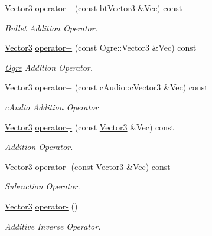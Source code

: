 \begin{DoxyCompactItemize}
\hyperlink{classMezzanine_1_1Vector3}{Vector3} \hyperlink{classMezzanine_1_1Vector3_ab9093d82a813c4c700daf6d01a66633b}{operator+} (const btVector3 \&Vec) const 
\begin{DoxyCompactList}\small\item\em Bullet Addition Operator. \item\end{DoxyCompactList}\item 
\hyperlink{classMezzanine_1_1Vector3}{Vector3} \hyperlink{classMezzanine_1_1Vector3_a1a11c416872d294739a505c04250d58d}{operator+} (const Ogre::Vector3 \&Vec) const 
\begin{DoxyCompactList}\small\item\em \hyperlink{namespaceOgre}{Ogre} Addition Operator. \item\end{DoxyCompactList}\item 
\hyperlink{classMezzanine_1_1Vector3}{Vector3} \hyperlink{classMezzanine_1_1Vector3_a1df3f5ceba13194dc744b551fb4ddbc2}{operator+} (const cAudio::cVector3 \&Vec) const 
\begin{DoxyCompactList}\small\item\em cAudio Addition Operator \item\end{DoxyCompactList}\item 
\hyperlink{classMezzanine_1_1Vector3}{Vector3} \hyperlink{classMezzanine_1_1Vector3_abaadfc0d5848107f4be81fd97eaa932b}{operator+} (const \hyperlink{classMezzanine_1_1Vector3}{Vector3} \&Vec) const 
\begin{DoxyCompactList}\small\item\em Addition Operator. \item\end{DoxyCompactList}\item 
\hyperlink{classMezzanine_1_1Vector3}{Vector3} \hyperlink{classMezzanine_1_1Vector3_acccf60385ca5264212a53c4278918231}{operator-\/} (const \hyperlink{classMezzanine_1_1Vector3}{Vector3} \&Vec) const 
\begin{DoxyCompactList}\small\item\em Subraction Operator. \item\end{DoxyCompactList}\item 
\hyperlink{classMezzanine_1_1Vector3}{Vector3} \hyperlink{classMezzanine_1_1Vector3_aeed0db21c3c82f0a8bb83e8007afca6d}{operator-\/} ()
\begin{DoxyCompactList}\small\item\em Additive Inverse Operator. \item\end{DoxyCompactList}\item 

\end{DoxyCompactItemize}
